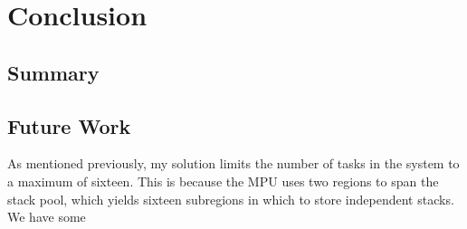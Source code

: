 
\chapter{Conclusion}

\section{Summary}

\section{Future Work}

As mentioned previously, my solution limits the number of tasks in the system to a maximum of sixteen. This is because the MPU uses two regions to span the stack pool, which yields sixteen subregions in which to store independent stacks. We have some 